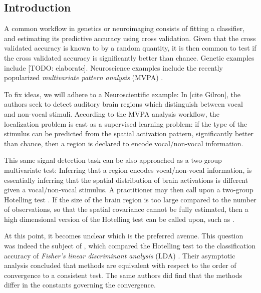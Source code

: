 \documentclass{pnastwo}
\begin{document}
\begin{article}

\begin{abstract}
[TODO]
\end{abstract}





\section{Introduction}

A common workflow in genetics or neuroimaging consists of fitting a classifier, and estimating its predictive accuracy using cross validation. 
Given that the cross validated accuracy is known to by a random quantity, it is then common to test if the cross validated accuracy is significantly better than chance. 
Genetic examples include [TODO: elaborate]\cite{jiang_calculating_2008,radmacher_paradigm_2002-1}.
Neuroscience examples include the recently popularized \emph{multivariate pattern analysis} (MVPA) \cite{kriegeskorte_information-based_2006,varoquaux_assessing_2016,golland_permutation_2003}.

To fix ideas, we will adhere to a Neuroscientific example: 
In [cite Gilron], the authors seek to detect auditory brain regions which distinguish between vocal and non-vocal stimuli. 
According to the MVPA analysis workflow, the localization problem is cast as a supervised learning problem: if the type of the stimulus can be predicted from the spatial activation pattern, significantly better than chance, then a region is declared to encode vocal/non-vocal information. 

This same signal detection task can be also approached as a two-group multivariate test:
Inferring that a region encodes vocal/non-vocal information, is essentially inferring that the spatial distribution of brain activations is different given a vocal/non-vocal stimulus. 
A practitioner may then call upon a two-group Hotelling test \cite{fujikoshi_multivariate_2011}. 
If the size of the brain region is too large compared to the number of observations, so that the spatial covariance cannot be fully estimated, then a high dimensional version of the Hotelling test can be called upon, such as  \cite{srivastava_testing_2013}.

At this point, it becomes unclear which is the preferred avenue. 
This question was indeed the subject of \cite{ramdas_classification_2016}, which compared the Hotelling test to the classification accuracy of \emph{Fisher's linear discriminant analysis} (LDA) \cite{hastie_elements_2003-1}. 
Their asymptotic analysis concluded that methods are equivalent with respect to the order of convergence to a consistent test. The same authors did find that the methods differ in the constants governing the convergence.


\end{article}
\end{document}
